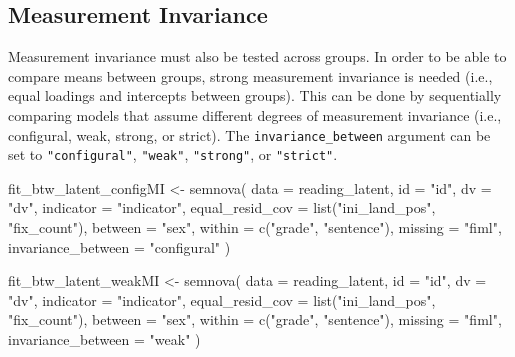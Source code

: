 \documentclass[
]{book}
\newenvironment{Shaded}{\begin{snugshade}}{\end{snugshade}}
\newcommand{\AttributeTok}[1]{\textcolor[rgb]{0.77,0.63,0.00}{#1}}
\newcommand{\FunctionTok}[1]{\textcolor[rgb]{0.00,0.00,0.00}{#1}}
\newcommand{\NormalTok}[1]{#1}
\newcommand{\OtherTok}[1]{\textcolor[rgb]{0.56,0.35,0.01}{#1}}
\newcommand{\StringTok}[1]{\textcolor[rgb]{0.31,0.60,0.02}{#1}}
\begin{document}
\hypertarget{measurement-invariance-1}{%
\subsection{Measurement Invariance}\label{measurement-invariance-1}}

Measurement invariance must also be tested across groups. In order to be able to compare means between groups, strong measurement invariance is needed (i.e., equal loadings and intercepts between groups). This can be done by sequentially comparing models that assume different degrees of measurement invariance (i.e., configural, weak, strong, or strict). The \texttt{invariance\_between} argument can be set to \texttt{"configural"}, \texttt{"weak"}, \texttt{"strong"}, or \texttt{"strict"}.

\begin{Shaded}
\begin{Highlighting}[]
\NormalTok{fit\_btw\_latent\_configMI }\OtherTok{\textless{}{-}} \FunctionTok{semnova}\NormalTok{(}
    \AttributeTok{data =}\NormalTok{ reading\_latent,}
    \AttributeTok{id =} \StringTok{"id"}\NormalTok{, }
    \AttributeTok{dv =} \StringTok{"dv"}\NormalTok{,}
    \AttributeTok{indicator =} \StringTok{"indicator"}\NormalTok{,}
    \AttributeTok{equal\_resid\_cov =} \FunctionTok{list}\NormalTok{(}\StringTok{"ini\_land\_pos"}\NormalTok{, }\StringTok{"fix\_count"}\NormalTok{),}
    \AttributeTok{between =} \StringTok{"sex"}\NormalTok{,}
    \AttributeTok{within =} \FunctionTok{c}\NormalTok{(}\StringTok{"grade"}\NormalTok{, }\StringTok{"sentence"}\NormalTok{),}
    \AttributeTok{missing =} \StringTok{"fiml"}\NormalTok{,}
    \AttributeTok{invariance\_between =} \StringTok{"configural"}
\NormalTok{)}

\NormalTok{fit\_btw\_latent\_weakMI }\OtherTok{\textless{}{-}} \FunctionTok{semnova}\NormalTok{(}
    \AttributeTok{data =}\NormalTok{ reading\_latent,}
    \AttributeTok{id =} \StringTok{"id"}\NormalTok{, }
    \AttributeTok{dv =} \StringTok{"dv"}\NormalTok{,}
    \AttributeTok{indicator =} \StringTok{"indicator"}\NormalTok{,}
    \AttributeTok{equal\_resid\_cov =} \FunctionTok{list}\NormalTok{(}\StringTok{"ini\_land\_pos"}\NormalTok{, }\StringTok{"fix\_count"}\NormalTok{),}
    \AttributeTok{between =} \StringTok{"sex"}\NormalTok{,}
    \AttributeTok{within =} \FunctionTok{c}\NormalTok{(}\StringTok{"grade"}\NormalTok{, }\StringTok{"sentence"}\NormalTok{),}
    \AttributeTok{missing =} \StringTok{"fiml"}\NormalTok{,}
    \AttributeTok{invariance\_between =} \StringTok{"weak"}
\NormalTok{)}


\end{Highlighting}
\end{Shaded}
\end{document}
